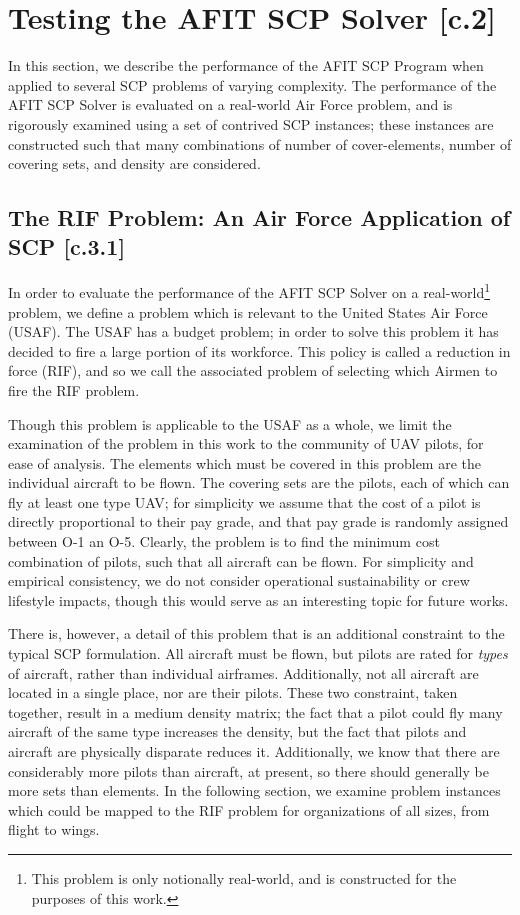 \documentclass[12pt]{article}
\begin{document}
\section{Testing the AFIT SCP Solver [c.2]} \label{scn:testing}

In this section, we describe the performance of the AFIT SCP Program when applied to several SCP problems of varying complexity. The performance of the AFIT SCP Solver is evaluated on a real-world Air Force problem, and is rigorously examined using a set of contrived SCP instances; these instances are constructed such that many combinations of number of cover-elements, number of covering sets, and density are considered. 

\subsection{The RIF Problem: An Air Force Application of SCP [c.3.1]} \label{scn:testing_usaf}

In order to evaluate the performance of the AFIT SCP Solver on a real-world\footnote{This problem is only notionally real-world, and is constructed for the purposes of this work.} problem, we define a problem which is relevant to the United States Air Force (USAF). The USAF has a budget problem; in order to solve this problem it has decided to fire a large portion of its workforce. This policy is called a reduction in force (RIF), and so we call the associated problem of selecting which Airmen to fire the RIF problem.

Though this problem is applicable to the USAF as a whole, we limit the examination of the problem in this work to the community of UAV pilots, for ease of analysis. The elements which must be covered in this problem are the individual aircraft to be flown. The covering sets are the pilots, each of which can fly at least one type UAV; for simplicity we assume that the cost of a pilot is directly proportional to their pay grade, and that pay grade is randomly assigned between O-1 an O-5. Clearly, the problem is to find the minimum cost combination of pilots, such that all aircraft can be flown. For simplicity and empirical consistency, we do not consider operational sustainability or crew lifestyle impacts, though this would serve as an interesting topic for future works. 

There is, however, a detail of this problem that is an additional constraint to the typical SCP formulation. All aircraft must be flown, but pilots are rated for \emph{types} of aircraft, rather than individual airframes. Additionally, not all aircraft are located in a single place, nor are their pilots. These two constraint, taken together, result in a medium density matrix; the fact that a pilot could fly many aircraft of the same type increases the density, but the fact that pilots and aircraft are physically disparate reduces it. Additionally, we know that there are considerably more pilots than aircraft, at present, so there should generally be more sets than elements. In the following section, we examine problem instances which could be mapped to the RIF problem for organizations of all sizes, from flight to wings. 
\end{document}
